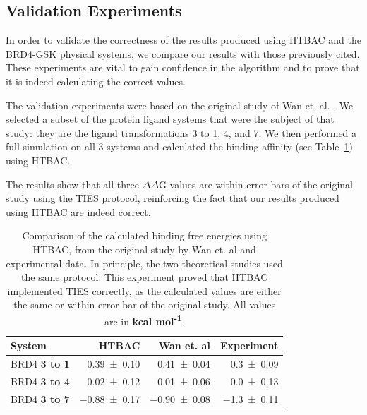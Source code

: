 \subsection{Validation Experiments}



In order to validate the correctness of the results produced using 
HTBAC and the BRD4-GSK physical systems, we compare our results with those 
previously cited. These experiments are vital to gain confidence in the
algorithm and to prove that it is indeed calculating the correct values.

The validation experiments were based on the original study of Wan et. al.
\cite{Wan2017brd4}. We selected a subset of the protein ligand systems that
were the subject of that study: they are the ligand transformations 3 to 1,
4, and 7. We then performed a full simulation on all 3 systems and calculated
the binding affinity (see Table~\ref{tab:exp2}) using HTBAC.

The results show that all three $\Delta \Delta$G values are within error bars
of the original study using the TIES protocol, reinforcing the fact that our 
results produced using HTBAC are indeed correct. 

\begin{table}
  \centering
  \caption{Comparison of the calculated binding free energies using HTBAC,
  from the original study by Wan et. al and experimental data. In principle,
  the two theoretical studies used the same protocol. This experiment proved
  that HTBAC implemented TIES correctly, as the calculated values are either
  the same or within error bar of the original study. All values are in
  \textbf{kcal mol\textsuperscript{-1}}.}
  \begin{tabular}{lrrr}
    \toprule
    System & HTBAC & Wan et. al & Experiment \\
    \midrule
    BRD4 \textbf{3 to 1} & \num{0.39 +- 0.10} &   \num{0.41 +- 0.04} &  \num{0.3 +- 0.09} \\
    BRD4 \textbf{3 to 4} & \num{0.02 +- 0.12} &   \num{0.01 +- 0.06} &  \num{0.0 +- 0.13} \\
    BRD4 \textbf{3 to 7} & \num{-0.88 +- 0.17} &  \num{-0.90 +- 0.08} & \num{-1.3 +- 0.11} \\
    \bottomrule
  \end{tabular}
  \label{tab:exp2}
\end{table}

